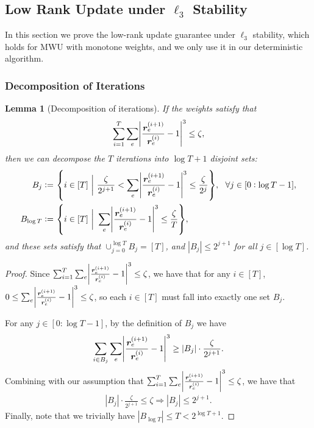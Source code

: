 \documentclass[11pt]{article}
\newtheorem{lemma}[theorem]{Lemma}
\def\implies{\Rightarrow}
\let\originalleft\left
\let\originalright\right
\renewcommand{\left}{\mathopen{}\mathclose\bgroup\originalleft}
\renewcommand{\right}{\aftergroup\egroup\originalright}
\newcommand\rr{\boldsymbol{\mathit{r}}}
\begin{document}
\subsection{Low Rank Update under \texorpdfstring{$\ell_3$}{} Stability}
In this section we prove the low-rank update guarantee under $\ell_3$ stability, which holds for MWU with monotone weights, and we only use it in our deterministic algorithm.
\subsubsection{Decomposition of Iterations}
\begin{lemma}[Decomposition of iterations]\label{lem:decomposition_iteration}
If the weights satisfy that 
\[
\sum_{i=1}^T \sum_{e} \left|\frac{\rr_e^{\left(i + 1\right)}}{\rr_e^{\left(i \right)}} - 1 \right|^3 \leq \zeta,
\]
then we can decompose the $T$ iterations into $\log T + 1$ disjoint sets:
\begin{align*}
B_j := &~ \left\{ i \in [T] ~\bigg|~ \frac{\zeta}{2^{j+1}} < \sum_{e} \left|\frac{\rr_e^{\left(i + 1\right)}}{\rr_e^{\left(i \right)}} - 1 \right|^3 \leq \frac{\zeta}{2^{j}} \right\},~~ \forall j \in [0:\log T-1], \\
B_{\log T} := &~ \left\{ i \in [T] ~\bigg|~ \sum_{e} \left|\frac{\rr_e^{\left(i + 1\right)}}{\rr_e^{\left(i \right)}} - 1 \right|^3 \leq \frac{\zeta}{T} \right\},
\end{align*}
and these sets satisfy that $\cup_{j=0}^{\log T} B_j = [T]$, and $|B_j| \leq 2^{j+1}$ for all $j \in [\log T]$.
\end{lemma}
\begin{proof}
Since $\sum_{i=1}^T \sum_{e} \left|\frac{\rr_e^{\left(i + 1\right)}}{\rr_e^{\left(i \right)}} - 1 \right|^3 \leq \zeta$, we have that for any $i \in [T]$, $0 \leq \sum_{e} \left|\frac{\rr_e^{\left(i + 1\right)}}{\rr_e^{\left(i \right)}} - 1 \right|^3 \leq \zeta$, so each $i \in [T]$ must fall into exactly one set $B_j$.

For any $j \in [0:\log T - 1]$, by the definition of $B_j$ we have
\begin{align*}
\sum_{i \in B_j} \sum_{e} \left|\frac{\rr_e^{\left(i + 1\right)}}{\rr_e^{\left(i \right)}} - 1 \right|^3 \geq |B_j| \cdot \frac{\zeta}{2^{j+1}}.
\end{align*}
Combining with our assumption that $\sum_{i=1}^T \sum_{e} \left|\frac{\rr_e^{\left(i + 1\right)}}{\rr_e^{\left(i \right)}} - 1 \right|^3 \leq \zeta$, we have that
\begin{align*}
|B_j| \cdot \frac{\zeta}{2^{j+1}} \leq \zeta \implies |B_j| \leq 2^{j+1}.
\end{align*}
Finally, note that we trivially have $|B_{\log T}| \leq T < 2^{\log T +1}$.
\end{proof}
\end{document}
